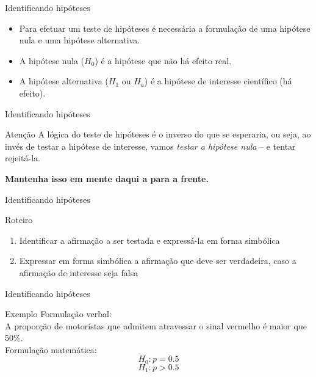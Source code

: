 \documentclass{beamer}
\begin{document}
\begin{frame}{Identificando hipóteses}
  \begin{itemize}
  \item Para efetuar um teste de hipóteses é necessária a formulação  de uma \alert{hipótese nula} e uma \alert{hipótese alternativa}.
  \item A hipótese nula ($H_0$) é a hipótese que não há efeito real.
  \item A hipótese alternativa ($H_1$ ou $H_a$) é a hipótese de interesse científico (há efeito).
  \end{itemize}
\end{frame}

\begin{frame}{Identificando hipóteses}
  \begin{block}{Atenção}
    A lógica do teste de hipóteses é o \alert{inverso} do que se esperaria, ou seja, ao invés de testar a hipótese de interesse, vamos {\em testar a hipótese nula} -- e tentar rejeitá-la.

\bigskip
{\bf Mantenha isso em mente daqui a para a frente.}
  \end{block}
\end{frame}

\begin{frame}{Identificando hipóteses}
  \begin{block}{Roteiro}
    \begin{enumerate}
    \item Identificar a afirmação a ser testada e expressá-la em forma simbólica
    \item Expressar em forma simbólica a afirmação que deve ser
      verdadeira, caso a afirmação de interesse seja falsa
    \end{enumerate}
  \end{block}
\end{frame}

\begin{frame}{Identificando hipóteses}
  \begin{exampleblock}{Exemplo}
    Formulação verbal:\\
    A proporção de motoristas que admitem atravessar o sinal vermelho
    é maior que 50\%.\\
    \bigskip
    Formulação matemática:\\
    \begin{displaymath}
      H_0: p=0.5
    \end{displaymath}
    \begin{displaymath}
      H_1: p>0.5
    \end{displaymath}
  \end{exampleblock}
\end{frame}
\end{document}
